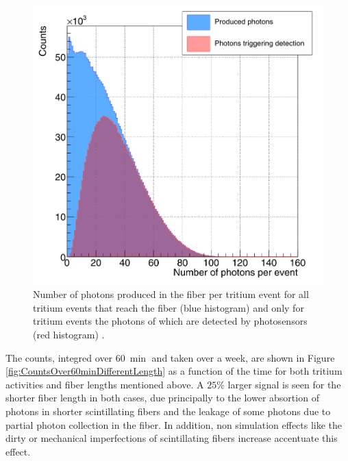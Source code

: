 \begin{figure}[h]
\centering
\includegraphics[scale=0.3]{Figures/8SimulationsResults/81TRITIUMDesign/813Length/CollectionPhotonsInFibers.png}
\caption{Number of photons produced in the fiber per tritium event for all tritium events that reach the fiber (blue histogram) and only for tritium events the photons of which are detected by photosensors (red histogram) \cite{SimulationPaperCarlos}.\label{fig:PhotonsFibersYesNoPhotosensors}}
\end{figure}


The counts, integred over $60~\min$ and taken over a week, are shown in Figure \ref{fig:CountsOver60minDifferentLength} as a function of the time for both tritium activities and fiber lengths mentioned above. A $25\%$ larger signal is seen for the shorter fiber length in both cases, due principally to the lower absortion of photons in shorter scintillating fibers and the leakage of some photons due to partial photon collection in the fiber. In addition, non simulation effects like the dirty or mechanical imperfections of scintillating fibers increase accentuate this effect.

